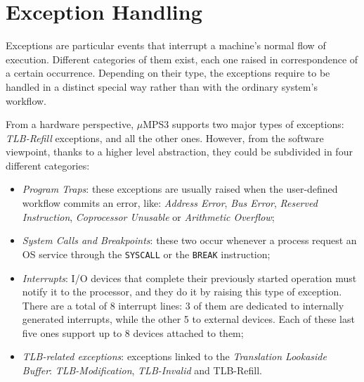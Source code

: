 \documentclass[12pt,a4paper,openright,twoside]{report}
\begin{document}
\chapter{Exception Handling}
\label{chap:exception_handling}
\lhead[\fancyplain{}{\bfseries\thepage}]{\fancyplain{}{\bfseries\rightmark}}
Exceptions are particular events that interrupt a machine's normal flow of execution.
Different categories of them exist, each one raised in correspondence of a certain occurrence.
Depending on their type, the exceptions require to be handled in a distinct special way rather than with the ordinary system's workflow.

From a hardware perspective, $\mu$MPS3 supports two major types of exceptions: \textit{TLB-Refill} exceptions, and all the other ones.
However, from the software viewpoint, thanks to a higher level abstraction, they could be subdivided in four different categories:
\begin{itemize}
	\item \textit{Program Traps}: these exceptions are usually raised when the user-defined workflow commits an error, like: \textit{Address Error}, \textit{Bus Error}, \textit{Reserved Instruction}, \textit{Coprocessor Unusable} or \textit{Arithmetic Overflow};
	\item \textit{System Calls and Breakpoints}: these two occur whenever a process request an OS service through the \texttt{SYSCALL} or the \texttt{BREAK} instruction;
	\item \textit{Interrupts}: I/O devices that complete their previously started operation must notify it to the processor, and they do it by raising this type of exception. There are a total of 8 interrupt lines: 3 of them are dedicated to internally generated interrupts, while the other 5 to external devices.
	      Each of these last five ones support up to 8 devices attached to them;
	\item \textit{TLB-related exceptions}: exceptions linked to the \textit{Translation Lookaside Buffer}: \textit{TLB-Modification}, \textit{TLB-Invalid} and TLB-Refill.
\end{itemize}
\end{document}
